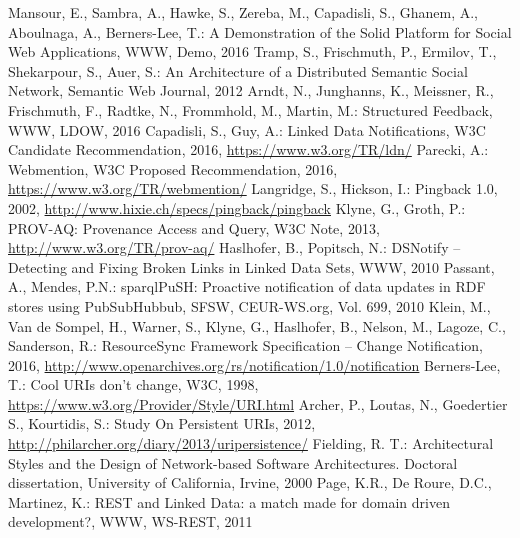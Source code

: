 \documentclass[a4paper]{llncs}
\begin{document}
\begin{thebibliography}{99}
   Mansour, E., Sambra, A., Hawke, S., Zereba, M., Capadisli, S., Ghanem, A., Aboulnaga, A., Berners-Lee, T.: A Demonstration of the Solid Platform for Social Web Applications, WWW, Demo, 2016%
   Tramp, S., Frischmuth, P., Ermilov, T., Shekarpour, S., Auer, S.: An Architecture of a Distributed Semantic Social Network, Semantic Web Journal, 2012
   Arndt, N., Junghanns, K., Meissner, R., Frischmuth, F., Radtke, N., Frommhold, M., Martin, M.: Structured Feedback, WWW, LDOW, 2016%
   Capadisli, S., Guy, A.: Linked Data Notifications, W3C Candidate Recommendation, 2016, \url{https://www.w3.org/TR/ldn/}
   Parecki, A.: Webmention, W3C Proposed Recommendation, 2016,  \url{https://www.w3.org/TR/webmention/}
   Langridge, S., Hickson, I.: Pingback 1.0, 2002,  \url{http://www.hixie.ch/specs/pingback/pingback}
   Klyne, G., Groth, P.: PROV-AQ: Provenance Access and Query,  W3C Note, 2013, \url{http://www.w3.org/TR/prov-aq/}
   Haslhofer, B., Popitsch, N.: DSNotify – Detecting and Fixing Broken Links in Linked Data Sets, WWW, 2010%
   Passant, A., Mendes, P.N.: sparqlPuSH: Proactive notification of data updates in RDF stores using PubSubHubbub, SFSW, CEUR-WS.org, Vol. 699, 2010%
   Klein, M., Van de Sompel, H., Warner, S., Klyne, G., Haslhofer, B., Nelson, M., Lagoze, C., Sanderson, R.: ResourceSync Framework Specification – Change Notification, 2016,  \url{http://www.openarchives.org/rs/notification/1.0/notification}
   Berners-Lee, T.: Cool URIs don't change, W3C, 1998,  \url{https://www.w3.org/Provider/Style/URI.html}
   Archer, P., Loutas, N., Goedertier S., Kourtidis, S.: Study On Persistent URIs, 2012, \url{http://philarcher.org/diary/2013/uripersistence/}
   Fielding, R. T.: Architectural Styles and the Design of Network-based Software Architectures. Doctoral dissertation, University of California, Irvine, 2000%
   Page, K.R., De Roure, D.C., Martinez, K.: REST and Linked Data: a match made for domain driven development?, WWW, WS-REST, 2011%

\end{thebibliography}
\end{document}
